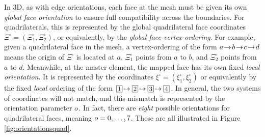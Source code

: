 In 3D, as with edge orientations, each face at the mesh must be given its own \textit{global face orientation} to ensure full compatibility across the boundaries.
For quadrilaterals, this is represented by the global quadrilateral face coordinates $\Xi^\square=(\Xi_1^\square,\Xi_2^\square)$, or equivalently, by the \textit{global face vertex-ordering}.
For example, given a quadrilateral face in the mesh, a vertex-ordering of the form $a\!\to\! b\!\to\! c\!\to\! d$ means the origin of $\Xi^\square$ is located at $a$, $\Xi_1^\square$ points from $a$ to $b$, and $\Xi_2^\square$ points from $a$ to $d$.
Meanwhile, at the master element, the mapped face has its own fixed \textit{local orientation}.
It is represented by the coordinates $\xi^\square=(\xi_1^\square,\xi_2^\square)$ or equivalently by the fixed \textit{local} ordering of the form $\boxednum{1}\!\tdashto\boxednum{2}\!\tdashto\boxednum{3}\!\tdashto\boxednum{4}$.
In general, the two systems of coordinates will not match, and this mismatch is represented by the orientation parameter $o$.
In fact, there are \textit{eight} possible orientations for quadrilateral faces, meaning $o=0,\ldots,7$.
These are all illustrated in Figure \ref{fig:orientationsquad}.



